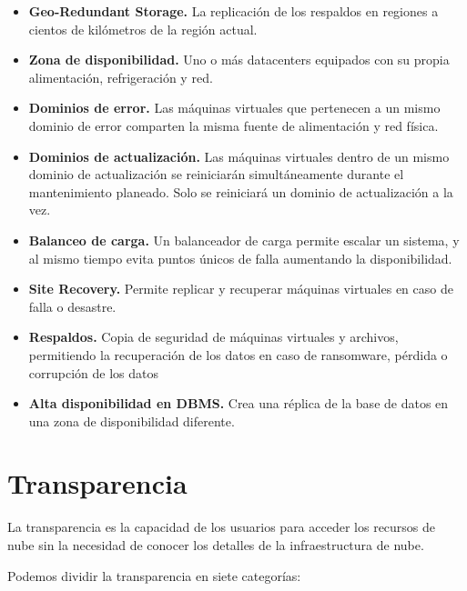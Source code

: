 \documentclass[11pt,a4paper,oneside]{book}
\begin{document}
\begin{itemize}

\item \textbf{Geo-Redundant Storage.} La replicación de los respaldos en regiones a cientos de kilómetros de la región actual.

\item \textbf{Zona de disponibilidad.} Uno o más datacenters equipados con su propia alimentación, refrigeración y red.

\item \textbf{Dominios de error.} Las máquinas virtuales que pertenecen a un mismo dominio de error comparten la misma fuente de alimentación y red física.

\item \textbf{Dominios de actualización.} Las máquinas virtuales dentro de un mismo dominio de actualización se reiniciarán simultáneamente durante el mantenimiento planeado. Solo se reiniciará un dominio de actualización a la vez.

\item \textbf{Balanceo de carga.} Un balanceador de carga permite escalar un sistema, y al mismo tiempo evita puntos únicos de falla aumentando la disponibilidad.

\item \textbf{Site Recovery.} Permite replicar y recuperar máquinas virtuales en caso de falla o desastre.

\item \textbf{Respaldos.} Copia de seguridad de máquinas virtuales y archivos, permitiendo la recuperación de los datos en caso de ransomware, pérdida o corrupción de los datos

\item \textbf{Alta disponibilidad en DBMS.} Crea una réplica de la base de datos en una zona de disponibilidad diferente.

\end{itemize}

\section{Transparencia}

La transparencia es la capacidad de los usuarios para acceder los recursos de nube sin la necesidad de conocer los detalles de la infraestructura de nube.

Podemos dividir la transparencia en siete categorías:
\end{document}
